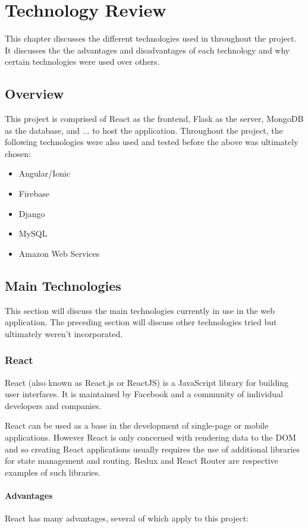 \chapter{Technology Review}
This chapter discusses the different technologies used in throughout the project. It discusses the the advantages and disadvantages of each technology and why certain technologies were used over others.

\section{Overview}
This project is comprised of React as the frontend, Flask as the server, MongoDB as the database, and ... to host the application. Throughout the project, the following technologies were also used and tested before the above was ultimately chosen:
\begin{itemize}
    \item Angular/Ionic
    \item Firebase
    \item Django
    \item MySQL
    \item Amazon Web Services
\end{itemize}

\section{Main Technologies}
This section will discuss the main technologies currently in use in the web application. The preceding section will discuss other technologies tried but ultimately weren't incorporated. 

\newpage

\subsection{React}
React (also known as React.js or ReactJS) is a JavaScript library for building user interfaces. It is maintained by Facebook and a community of individual developers and companies.

React can be used as a base in the development of single-page or mobile applications. However React is only concerned with rendering data to the DOM and so creating React applications usually requires the use of additional libraries for state management and routing. Redux and React Router are respective examples of such libraries. 

\subsubsection{Advantages}
React has many advantages, several of which apply to this project:

